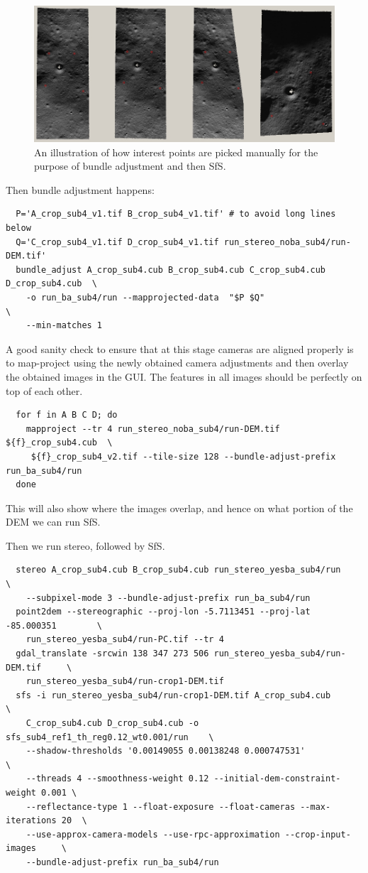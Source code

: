 \begin{figure}[t!]
\begin{center}
\includegraphics[width=7in]{images/sfs3.jpg}
\caption[sfs]{An illustration of how interest points are picked manually for the purpose of bundle adjustment and then SfS.}
\label{fig:sfs3}
\end{center}
\end{figure}

Then bundle adjustment happens:
\begin{verbatim}
  P='A_crop_sub4_v1.tif B_crop_sub4_v1.tif' # to avoid long lines below
  Q='C_crop_sub4_v1.tif D_crop_sub4_v1.tif run_stereo_noba_sub4/run-DEM.tif'
  bundle_adjust A_crop_sub4.cub B_crop_sub4.cub C_crop_sub4.cub D_crop_sub4.cub  \
    -o run_ba_sub4/run --mapprojected-data  "$P $Q"                              \
    --min-matches 1
\end{verbatim}

A good sanity check to ensure that at this stage cameras are aligned properly is to map-project
using the newly obtained camera adjustments and then overlay the obtained images in the GUI.
The features in all images should be perfectly on top of each other.
\begin{verbatim}
  for f in A B C D; do 
    mapproject --tr 4 run_stereo_noba_sub4/run-DEM.tif ${f}_crop_sub4.cub  \
     ${f}_crop_sub4_v2.tif --tile-size 128 --bundle-adjust-prefix run_ba_sub4/run
  done
\end{verbatim}
This will also show where the images overlap, and hence on what portion of the DEM we
can run SfS.

Then we run stereo, followed by SfS. 
\begin{verbatim}
  stereo A_crop_sub4.cub B_crop_sub4.cub run_stereo_yesba_sub4/run             \
    --subpixel-mode 3 --bundle-adjust-prefix run_ba_sub4/run
  point2dem --stereographic --proj-lon -5.7113451 --proj-lat -85.000351        \
    run_stereo_yesba_sub4/run-PC.tif --tr 4
  gdal_translate -srcwin 138 347 273 506 run_stereo_yesba_sub4/run-DEM.tif     \
    run_stereo_yesba_sub4/run-crop1-DEM.tif 
  sfs -i run_stereo_yesba_sub4/run-crop1-DEM.tif A_crop_sub4.cub               \
    C_crop_sub4.cub D_crop_sub4.cub -o sfs_sub4_ref1_th_reg0.12_wt0.001/run    \
    --shadow-thresholds '0.00149055 0.00138248 0.000747531'                    \
    --threads 4 --smoothness-weight 0.12 --initial-dem-constraint-weight 0.001 \
    --reflectance-type 1 --float-exposure --float-cameras --max-iterations 20  \
    --use-approx-camera-models --use-rpc-approximation --crop-input-images     \
    --bundle-adjust-prefix run_ba_sub4/run
\end{verbatim}

